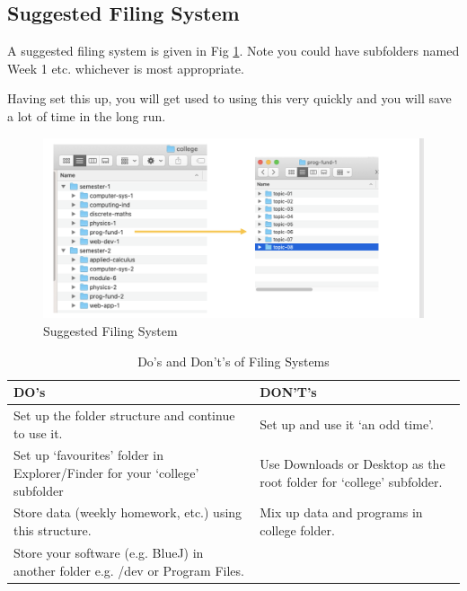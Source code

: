 \documentclass{article}
\begin{document}
\subsection{Suggested Filing System}

A suggested filing system is given in Fig \ref{filing}. Note you could have subfolders named Week 1 etc. whichever is most appropriate. 

Having set this up, you will get used to using this very quickly and you will save a lot of time in the long run. 
\begin{figure}[h]
\centering
\includegraphics[width=.6\textwidth]{img/filing.png}
\caption{Suggested Filing System}
\label{filing}
\end{figure}

\begin{table}[h]
\begin{center}
    \begin{tabular}{ | m{15em}   |m{15em}  }    
        \hline
    \rowcolor{shade3}
    \cellcolor{shade1}DO's & DON'T's   \\ 
     \hline  
     \rowcolor{shade4}
     \cellcolor{shade2} Set up the folder structure and continue to use it. 
     & Set up and use it ‘an odd time’.
     \\  
     \rowcolor{shade4}
     \hline
     \cellcolor{shade2}Set up ‘favourites’ folder in Explorer/Finder for your ‘college’ subfolder
 & Use Downloads or Desktop as the root folder for ‘college' subfolder. \\ 
 \hline
     \rowcolor{shade4}
     \cellcolor{shade2}Store data (weekly homework, etc.) using this structure.
     &Mix up data and programs in college folder.
     \\ 
     \hline
     \rowcolor{shade4}
     \cellcolor{shade2}Store your software (e.g. BlueJ) in another folder e.g. /dev or Program Files.
 &   \\ 
     \hline
 
  
    \end{tabular}
    \caption{Do's and Don't's of Filing Systems}
    \label{tab:dos-donts}
\end{center}
\end{table}
\end{document}
